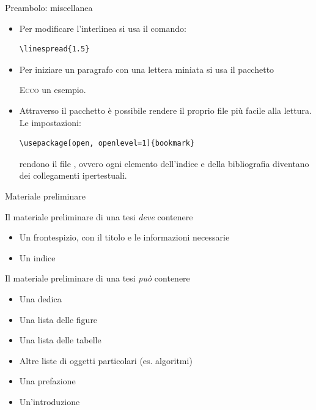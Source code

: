 \documentclass{beamer}
\begin{document}
\begin{frame}[fragile]{Preambolo: miscellanea}
\begin{itemize}
\item Per modificare l'interlinea si usa il comando:
\begin{verbatim}
\linespread{1.5}
\end{verbatim}
\item Per iniziare un paragrafo con una lettera miniata si usa il pacchetto 
\begin{exampletwouptiny}
\lettrine{E}{cco} un esempio.
\end{exampletwouptiny}
\item Attraverso il pacchetto  \`e possibile rendere il proprio file pi\`u facile alla lettura. Le impostazioni:

\begin{verbatim}
\usepackage[open, openlevel=1]{bookmark}
\end{verbatim}
rendono il file , ovvero ogni elemento dell'indice e della bibliografia diventano dei collegamenti ipertestuali.
\end{itemize}

\end{frame}

\begin{frame}{Materiale preliminare}

\begin{block}{Il materiale preliminare di una tesi \textit{deve} contenere}
\begin{itemize}
\item Un frontespizio, con il titolo e le informazioni necessarie
\item Un indice
\end{itemize}
\end{block}

\begin{block}{Il materiale preliminare di una tesi \textit{pu\`o} contenere}
\begin{itemize}
\item Una dedica
\item Una lista delle figure
\item Una lista delle tabelle
\item Altre liste di oggetti particolari (es. algoritmi)
\item Una prefazione
\item Un'introduzione
\end{itemize}
\end{block}

\end{frame}
\end{document}
